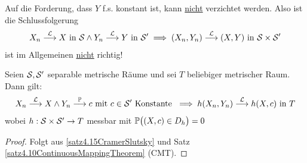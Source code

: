 \begin{bemerkungnr}\label{bemerkung4.16} %
	Auf die Forderung, dass $Y$ f.s. konstant ist, kann \underline{nicht} verzichtet werden. 
	Also ist die Schlussfolgerung
	\begin{align*}
		X_n\stackrel{\L}{\longrightarrow} X\text{ in }\S\wedge Y_n\stackrel{\L}{\longrightarrow} Y\text{ in }\S'
		\implies(X_n,Y_n)\stackrel{\L}{\longrightarrow}(X,Y)\text{ in }\S\times\S'
	\end{align*}
	ist im Allgemeinen \underline{nicht} richtig!
\end{bemerkungnr}

\begin{korollar}\label{korollar4.17}
	Seien $\S,\S'$ separable metrische Räume und sei $T$ beliebiger metrischer Raum. 
	Dann gilt:
	\begin{align*}
		X_n\stackrel{\L}{\longrightarrow} X\wedge Y_n\stackrel{\P}{\longrightarrow} c\mit c\in\S'\text{ Konstante }
		\implies h(X_n,Y_n)\stackrel{\L}{\longrightarrow} h(X,c)\text{ in }T
	\end{align*}
	wobei $h:\S\times\S'\to T$ messbar mit $\P\big((X,c)\in D_h\big)=0$
\end{korollar}

\begin{proof}
	Folgt aus \ref{satz4.15CramerSlutsky} und Satz \ref{satz4.10ContinuousMappingTheorem} (CMT).
\end{proof}

